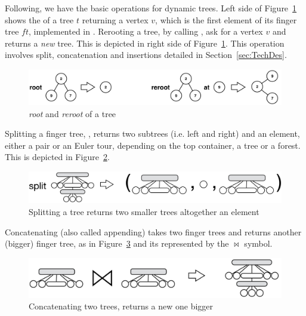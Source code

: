 Following, we have the basic operations for dynamic trees. Left side of Figure~\ref{fig:rootReroot} shows the  of a tree $t$ returning a vertex $v$, which is the first element of its finger tree $ft$, implemented in . Rerooting a tree, by calling , ask for a vertex $v$ and returns a \textit{new} tree. This is depicted in right side of Figure~\ref{fig:rootReroot}. This operation involves split, concatenation and insertions detailed in Section~\ref{sec:TechDes}.
\begin{figure}
\begin{center}
\includegraphics[scale=0.3]{./Images/rootReroot} 
\end{center}
\caption{\textit{root} and \textit{reroot} of a tree}
\label{fig:rootReroot}
\end{figure}

Splitting a finger tree, , returns two subtrees (i.e. left and right) and an element, either a pair or an Euler tour, depending on the top container, a tree or a forest. This is depicted in Figure~\ref{fig:split}.
\begin{figure}
\begin{center}
\includegraphics[scale=0.25]{./Images/split} 
\end{center}
\caption{Splitting a tree returns two smaller trees altogether an element}
\label{fig:split}
\end{figure}

Concatenating (also called appending) takes two finger trees and returns another (bigger) finger tree, as in Figure~\ref{fig:concatenation} and its represented by the $\bowtie$ symbol.
\begin{figure}
\begin{center}
\includegraphics[scale=0.25]{./Images/concatenation} 
\end{center}
\caption{Concatenating two trees, returns a new one bigger}
\label{fig:concatenation}
\end{figure}


